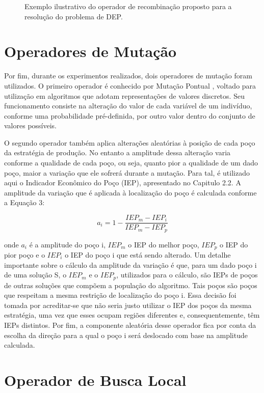\begin{figure}[htb]

\caption{Exemplo ilustrativo do operador de recombinação proposto para a resolução do problema de DEP.}


\end{figure}

\section{Operadores de Mutação}

Por fim, durante os experimentos realizados, dois operadores de mutação foram utilizados. O primeiro operador é conhecido por Mutação Pontual \cite{Kacprzyk2015}, voltado para utilização em algoritmos que adotam representações de valores discretos. Seu funcionamento consiste na alteração do valor de cada variável de um indivíduo, conforme uma probabilidade pré-definida, por outro valor dentro do conjunto de valores possíveis.

O segundo operador também aplica alterações aleatórias à posição de cada poço da estratégia de produção. No entanto a amplitude dessa alteração varia conforme a qualidade de cada poço, ou seja, quanto pior a qualidade de um dado poço, maior a variação que ele sofrerá durante a mutação. Para tal, é utilizado aqui o Indicador Econômico do Poço (IEP), apresentado no Capitulo 2.2. A amplitude da variação que é aplicada à localização do poço é calculada conforme a Equação 3:

$$a_i = 1 - \frac{IEP_m -IEP_i}{IEP_m -IEP_p}$$

onde $a_i$ é a amplitude do poço i, $IEP_m$ o IEP do melhor poço, $IEP_p$ o IEP do pior poço e o $IEP_i$  o IEP do poço i que está sendo alterado. Um detalhe importante sobre o cálculo da amplitude da variação é que, para um dado poço i de uma solução S, o $IEP_m$ e o $IEP_p$, utilizados para o cálculo, são IEPs de poços de outras soluções que compõem a população do algoritmo. Tais poços são poços que respeitam a mesma restrição de localização do poço i. Essa decisão foi tomada por acreditar-se que não seria justo utilizar o IEP dos poços da mesma estratégia, uma vez que esses ocupam regiões diferentes e, consequentemente, têm IEPs distintos. Por fim, a componente aleatória desse operador fica por conta da escolha da direção para a qual o poço i será deslocado com base na amplitude calculada.

\section{Operador de Busca Local}

